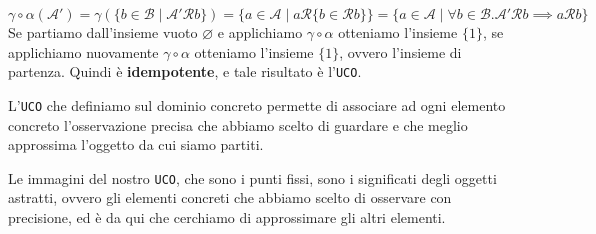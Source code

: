 \[
    \gamma \circ \alpha (\mathcal{A}') = 
    \gamma (\{b \in \mathcal{B} \mid \mathcal{A}' \mathcal{R} b\}) = 
    \{ a \in \mathcal{A} \mid a \mathcal{R} \{ b \in \mathcal{R} b\}\}
    = \{a \in \mathcal{A} \mid  \forall b \in \mathcal{B} . \mathcal{A}'
    \mathcal{R} b \implies a \mathcal{R} b\}
\]
Se partiamo dall'insieme vuoto $\varnothing$ e applichiamo $\gamma \circ \alpha$
otteniamo l'insieme $\{1\}$, se applichiamo nuovamente $\gamma \circ \alpha$ 
otteniamo l'insieme $\{1\}$, ovvero l'insieme di partenza. Quindi è \textbf{idempotente},
e tale risultato è l'\texttt{UCO}.

L'\texttt{UCO} che definiamo sul dominio concreto permette di associare ad ogni elemento concreto l'osservazione 
precisa che abbiamo scelto di guardare e che meglio approssima l'oggetto da cui siamo partiti.

Le immagini del nostro \texttt{UCO}, che sono i punti fissi, sono i significati degli oggetti astratti, ovvero 
gli elementi concreti che abbiamo scelto di osservare con precisione, ed è da qui che cerchiamo di 
approssimare gli altri elementi.


